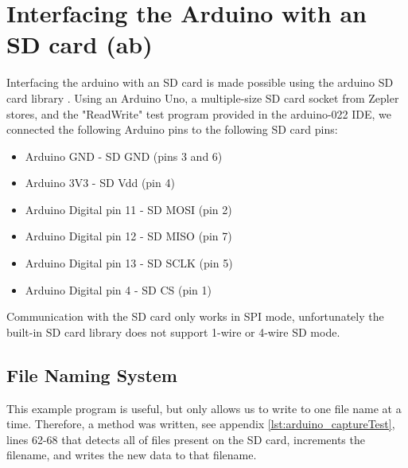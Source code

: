 \section{Interfacing the Arduino with an SD card (ab)}
\label{sec:SD_imp}

Interfacing the arduino with an SD card is made possible using the arduino SD card library \cite{arduino_sd_library}. Using an Arduino Uno,
 a multiple-size SD card socket from Zepler stores, and the 
"ReadWrite" test program provided in the arduino-022 IDE, we connected the following Arduino pins to the following SD card pins:

\begin{itemize}
\item Arduino GND - SD GND (pins 3 and 6)
\item Arduino 3V3 - SD Vdd (pin 4)
\item Arduino Digital pin 11 - SD MOSI (pin 2)
\item Arduino Digital pin 12 - SD MISO (pin 7)
\item Arduino Digital pin 13 - SD SCLK (pin 5)
\item Arduino Digital pin 4 - SD CS (pin 1)
\end{itemize}

Communication with the SD card only works in SPI mode, unfortunately the built-in 
SD card library does not support 1-wire or 4-wire SD mode.

\subsection{File Naming System}

This example program is useful, but only allows us to write to one file name at 
a time. Therefore, a method was written, see appendix \ref{lst:arduino_captureTest}, lines 62-68 that detects all of files present on the SD card, increments the filename, and 
writes the new data to that filename.
